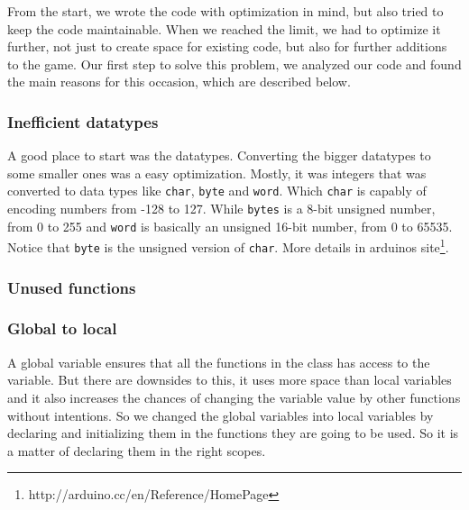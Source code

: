 From the start, we wrote the code with optimization in mind, but also tried
to keep the code maintainable. When we reached the limit, we had to optimize
it further, not just to create space for existing code, but also for further
additions to the game.
Our first step to solve this problem, we analyzed our code and found the main
reasons for this occasion, which are described below.


\subsubsection{Inefficient datatypes}
A good place to start was the datatypes. Converting the bigger datatypes
to some smaller ones was a easy optimization. Mostly, it was integers that
was converted to data types like {\tt char}, {\tt byte} and {\tt word}.
Which {\tt char} is capably of encoding numbers from -128 to 127. While
{\tt bytes} is a 8-bit unsigned number, from 0 to 255 and {\tt word} is
basically an unsigned 16-bit number, from 0 to 65535. Notice that {\tt byte}
is the unsigned version of {\tt char}. More details in arduinos site\footnote{http://arduino.cc/en/Reference/HomePage}.
\subsubsection{Unused functions}
\subsubsection{Global to local}
A global variable ensures that all the
functions in the class has access to the variable. But there are downsides
to this, it uses more space than local variables and it also increases the chances
of changing the variable value by other functions without intentions. So we changed
the global variables into local variables by declaring and initializing them in the
functions they are going to be used. So it is a matter of declaring them in the right
scopes.
